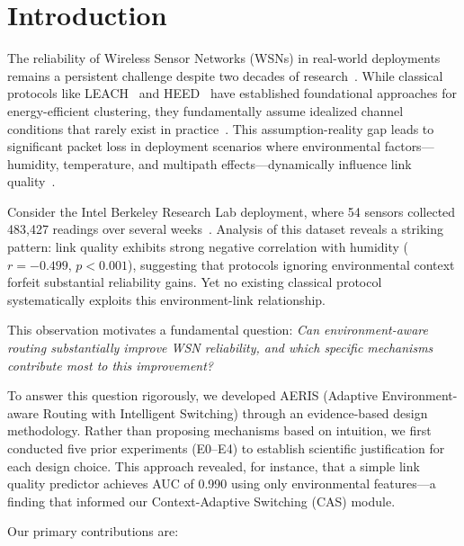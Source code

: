 \documentclass[sensors,article,submit,moreauthors,pdftex]{Definitions/mdpi}
\begin{document}
\section{Introduction}

The reliability of Wireless Sensor Networks (WSNs) in real-world deployments remains a persistent challenge despite two decades of research~\cite{Akyildiz2002Survey}. While classical protocols like LEACH~\cite{Heinzelman2000LEACH} and HEED~\cite{Younis2004HEED} have established foundational approaches for energy-efficient clustering, they fundamentally assume idealized channel conditions that rarely exist in practice~\cite{Zuniga2004,Zuniga2007Asymmetry}. This assumption-reality gap leads to significant packet loss in deployment scenarios where environmental factors---humidity, temperature, and multipath effects---dynamically influence link quality~\cite{Baccour2012RLQE}.

Consider the Intel Berkeley Research Lab deployment, where 54 sensors collected 483,427 readings over several weeks~\cite{IntelLabData2004}. Analysis of this dataset reveals a striking pattern: link quality exhibits strong negative correlation with humidity ($r = -0.499$, $p < 0.001$), suggesting that protocols ignoring environmental context forfeit substantial reliability gains. Yet no existing classical protocol systematically exploits this environment-link relationship.

This observation motivates a fundamental question: \textit{Can environment-aware routing substantially improve WSN reliability, and which specific mechanisms contribute most to this improvement?}

To answer this question rigorously, we developed AERIS (Adaptive Environment-aware Routing with Intelligent Switching) through an evidence-based design methodology. Rather than proposing mechanisms based on intuition, we first conducted five prior experiments (E0--E4) to establish scientific justification for each design choice. This approach revealed, for instance, that a simple link quality predictor achieves AUC of 0.990 using only environmental features---a finding that informed our Context-Adaptive Switching (CAS) module.

Our primary contributions are:
\end{document}
